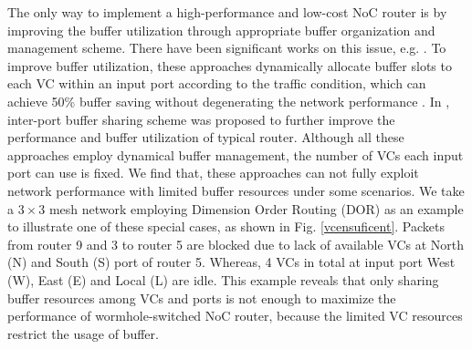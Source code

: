 \documentclass[paper]{ieice}
\begin{document}
The only way to implement a high-performance and low-cost NoC router is by improving the buffer utilization through appropriate buffer organization and management scheme. There have been significant works on this issue, e.g. \cite{NPKV06,4555894,6310960}. To improve buffer utilization, these approaches dynamically allocate buffer slots to each VC within an input port according to the traffic condition, which can achieve 50\% buffer saving without degenerating the network performance \cite{NPKV06}. In \cite{Neishaburi:2009:RAN:1531542.1531658}\cite{5770788},
inter-port buffer sharing scheme was proposed to further improve the performance and buffer utilization of typical router. Although all these approaches employ dynamical buffer management, the number of VCs each input port can use is fixed. We find that, these approaches can not fully exploit network performance with limited buffer resources under some scenarios. We take a $3\times 3$ mesh network employing Dimension Order Routing (DOR) as an example to illustrate one of these special cases, as shown in Fig. \ref{vcensuficent}. Packets from router 9 and 3 to router 5 are blocked due to lack of available VCs at North (N) and South (S) port of router 5. Whereas, 4 VCs in total at input port West (W), East (E) and Local (L) are idle. This example reveals that only sharing buffer resources among VCs and ports is not enough to maximize the performance of wormhole-switched NoC router, because the limited VC resources restrict the usage of buffer.
\end{document}
